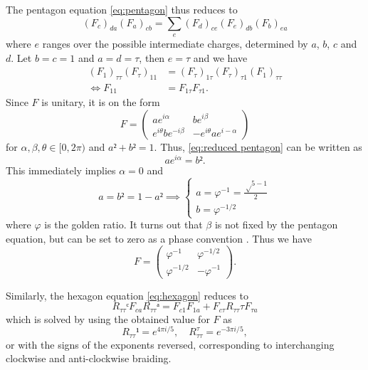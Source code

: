The pentagon equation \ref{eq:pentagon} thus reduces to
\begin{equation}
  \left(F_c\right)_{da} \left(F_a\right)_{cb} = \sum_e \left(F_d\right)_{ce} \left(F_e\right)_{db} \left(F_b\right)_{ea}
\end{equation}
where $e$ ranges over the possible intermediate charges, determined by $a$, $b$, $c$ and $d$. Let $b=c=1$ and $a=d=τ$, then $e=τ$ and we have
\begin{equation}\label{eq:reduced pentagon}
  \begin{aligned}
    \left(F_1\right)_{ττ} \left(F_τ\right)_{11} &= \left(F_τ\right)_{1τ} \left(F_τ\right)_{τ1} \left(F_1\right)_{ττ} \\
                                    \iff F_{11} &= F_{1τ} F_{τ1}.
  \end{aligned}
\end{equation}
Since $F$ is unitary, it is on the form
\begin{equation}
  F =
  \begin{pmatrix}
    ae^{iα} & be^{iβ} \\
    e^{iθ}be^{-iβ} & -e^{iθ}ae^{i-α}
  \end{pmatrix}
\end{equation}
for $α, β, θ ∈ [0,2π)$ and $a² + b² = 1$. Thus, \cref{eq:reduced pentagon} can be written as
\begin{equation}
  ae^{iα} = b².
\end{equation}
This immediately implies $α=0$ and
\begin{equation}
  a = b² = 1 - a² ⟹
    \begin{cases}
    a = φ^{-1} = \frac{√{5}-1}{2} \\
    b = φ^{-1/2}
  \end{cases}
\end{equation}
where $φ$ is the golden ratio. It turns out that $β$ is not fixed by the pentagon equation, but can be set to zero as a phase convention \cite{preskill}. Thus we have
\begin{equation*}
  F =
  \begin{pmatrix}
    φ^{-1} & φ^{-1/2} \\
    φ^{-1/2} & -φ^{-1}
  \end{pmatrix}.
\end{equation*}

Similarly, the hexagon equation \ref{eq:hexagon} reduces to
\begin{equation}
  R_{ττ}ᶜ F_{ca} R_{ττ}ᵃ = F_{c1} F_{1a} + F_{cτ} R_{ττ}τ F_{τa}
\end{equation}
which is solved by using the obtained value for $F$ as \cite{short intro fib}
\begin{equation}
  R_{ττ}¹ = e^{4πi/5}, \quad R_{ττ}^τ = e^{-3πi/5},
\end{equation}
or with the signs of the exponents reversed, corresponding to interchanging clockwise and anti-clockwise braiding.


